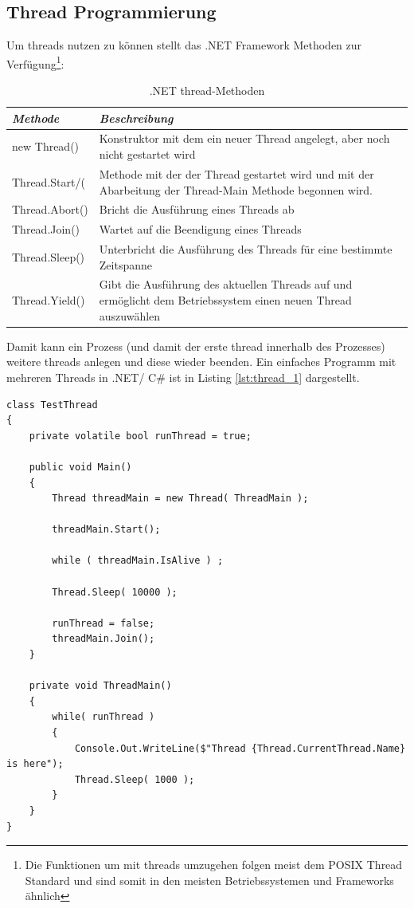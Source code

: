 \subsection{Thread Programmierung}
Um threads nutzen zu können stellt das .NET Framework  Methoden zur Verfügung\parencite{ms_threading}\footnote{Die Funktionen um mit threads umzugehen folgen meist dem POSIX Thread Standard und sind somit in den meisten Betriebssystemen und Frameworks ähnlich\parencite{butenhof1997} }:
\begin{table}[]
	\centering
	\label{Ttab:thread-methoden}
	\begin{tabular}{| l | p{10cm} |}
		\hline
		\textit{\textbf{Methode}} & \textit{\textbf{Beschreibung}}  \\
		\hline
		new Thread()                                         &    Konstruktor mit dem ein neuer Thread angelegt, aber noch nicht gestartet wird\\
		\hline
		Thread.Start/(                                        &    Methode mit der der Thread gestartet wird und mit der Abarbeitung der Thread-Main Methode begonnen wird.\\
		\hline
		Thread.Abort()                                        &   Bricht die Ausführung eines Threads ab\\
		\hline
		Thread.Join()										 & Wartet auf die Beendigung eines Threads\\
		\hline
		Thread.Sleep()										& Unterbricht die Ausführung des Threads für eine bestimmte Zeitspanne\\
		\hline
		Thread.Yield()										& Gibt die Ausführung des aktuellen Threads auf und ermöglicht dem Betriebssystem einen neuen Thread auszuwählen\parencite{ms_threading_yield}\\
		\hline
	\end{tabular}
	\caption{.NET thread-Methoden}
\end{table}
Damit kann ein Prozess (und damit der erste thread innerhalb des Prozesses) weitere threads anlegen und diese wieder beenden. Ein einfaches Programm mit mehreren Threads in .NET/ C\# ist in Listing \ref{lst:thread_1} dargestellt.
\begin{lstlisting}[caption={Thread Hello World},label={lst:thread_1},captionpos=b]
class TestThread
{
	private volatile bool runThread = true;
	
	public void Main()
	{
		Thread threadMain = new Thread( ThreadMain );

		threadMain.Start();

		while ( threadMain.IsAlive ) ;

		Thread.Sleep( 10000 );

		runThread = false;
		threadMain.Join();
	}
	
	private void ThreadMain()
	{
		while( runThread )
		{
			Console.Out.WriteLine($"Thread {Thread.CurrentThread.Name} is here");
			Thread.Sleep( 1000 );
		}
	}
}
\end{lstlisting}
